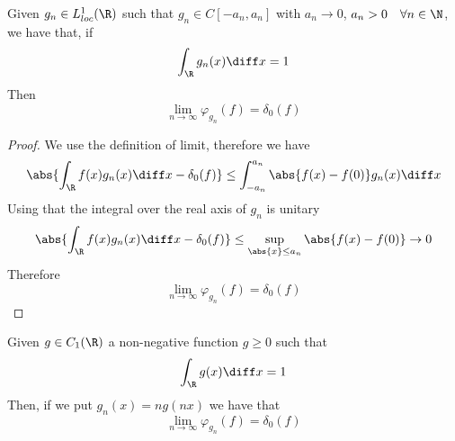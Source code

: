 \documentclass[../mmf.tex]{subfiles}
\begin{document}
\begin{thm}
	Given $g_n\in L^1_{loc}(\R)$ such that $g_n\in C[-a_n,a_n]$ with $a_n\to0$, $a_n>0\quad\forall n\in\N$, we have that, if
	\begin{equation*}
		\int_{\R}^{}g_n(x)\diff x=1
	\end{equation*}
	Then
	\begin{equation*}
		\lim_{n\to\infty}\varphi_{g_n}(f)=\delta_0(f)
	\end{equation*}
\end{thm}
\begin{proof}
	We use the definition of limit, therefore we have
	\begin{equation*}
		\abs{\int_{\R}^{}f(x)g_n(x)\diff x-\delta_0(f)}\le\int_{-a_n}^{a_n}\abs{f(x)-f(0)}g_n(x)\diff x
	\end{equation*}
	Using that the integral over the real axis of $g_n$ is unitary
	\begin{equation*}
		\abs{\int_{\R} f(x)g_n(x)\diff x-\delta_0(f)}\le\sup_{\abs{x}\le a_n}\abs{f(x)-f(0)}\to0
	\end{equation*}
	Therefore
	\begin{equation*}
		\lim_{n\to\infty}\varphi_{g_n}(f)=\delta_0(f)
	\end{equation*}
\end{proof}
\begin{cor}
	Given $g\in C_1(\R)$ a non-negative function $g\ge0$ such that
	\begin{equation*}
		\int_{\R}^{}g(x)\diff x=1
	\end{equation*}
	Then, if we put $g_n(x)=ng(nx)$ we have that
	\begin{equation*}
		\lim_{n\to\infty}\varphi_{g_n}(f)=\delta_0(f)
	\end{equation*}
\end{cor}
\end{document}
